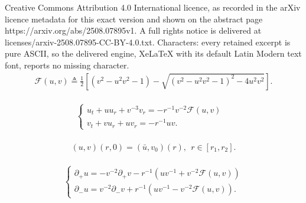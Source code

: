 \documentclass[10pt,a4paper]{amsart}
\begin{document}
Creative Commons Attribution 4.0 International licence, as recorded in the arXiv licence metadata for this exact version and shown on the abstract page https://arxiv.org/abs/2508.07895v1. A full rights notice is delivered at licenses/arxiv-2508.07895-CC-BY-4.0.txt. Characters: every retained excerpt is pure ASCII, so the delivered engine, XeLaTeX with its default Latin Modern text font, reports no missing character.
	\begin{equation} \label{def of F}
		\begin{aligned}
			\mathcal{F}(u,v) \triangleq  \frac{1}{2}[ ( v^{2}-u^{2}v^{2}-1 ) - \sqrt{(v^{2}-u^{2}v^{2}-1)^2 -4u^{2}v^{2} }  ].
		\end{aligned}
	\end{equation}

\begin{equation} \label{u v eq3}
	\begin{aligned}
		\begin{split}
			\left\lbrace
			\begin{array}{lr}
				u_{t} + uu_{r} + v^{-3}v_{r} = - r^{-1} v^{-2} \mathcal{F} (u,v) & \\ 
				v_{t} + v u_{r} + uv_{r} =- r^{-1} uv . &
			\end{array}	
			\right.
		\end{split}	
	\end{aligned}
\end{equation}

\begin{equation} \label{ID}
	\begin{aligned}
		(u,v) (r,0) = (\bar{u},v_0)(r), \ \ r \in [r_1,r_2].
	\end{aligned}
\end{equation}

\begin{equation} \label{u c pm}
	\begin{aligned}
		\begin{split}
			\left\lbrace
			\begin{array}{lr}	
				\partial_{+} u = -v^{-2}\partial_{+} v - r^{-1}( uv^{-1}+ v^{-2}\mathcal{F}(u,v)) \\
				\partial_{-} u = v^{-2}\partial_{-} v + r^{-1}( uv^{-1}- v^{-2}\mathcal{F}(u,v)).
			\end{array}	
			\right.
		\end{split}	
	\end{aligned}
\end{equation}
\end{document}
